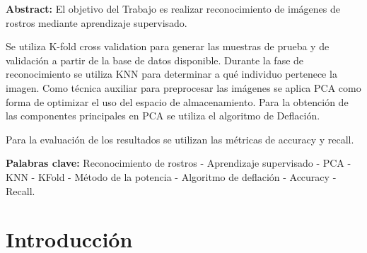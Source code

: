 \documentclass[10pt,a4paper]{article}
\begin{document}


\fecha{\today}



\maketitle
\par \textbf{Abstract:} El objetivo del Trabajo es realizar reconocimiento de imágenes de rostros mediante aprendizaje supervisado. 
\par Se utiliza K-fold cross validation para generar las muestras de prueba y de validación a partir de la base de datos disponible. Durante la fase de reconocimiento se utiliza KNN para determinar a qué individuo pertenece la imagen. Como técnica auxiliar para preprocesar las imágenes se aplica PCA como forma de optimizar el uso del espacio de almacenamiento. Para la obtención de las componentes principales en PCA se utiliza el algoritmo de Deflación.
\par Para la evaluación de los resultados se utilizan las métricas de accuracy y recall.

\par  \textbf{Palabras clave:} Reconocimiento de rostros - Aprendizaje supervisado - PCA - KNN - KFold - Método de la potencia - Algoritmo de deflación - Accuracy - Recall.


\tableofcontents

\newpage

\section{Introducción}

\newpage

\end{document}

